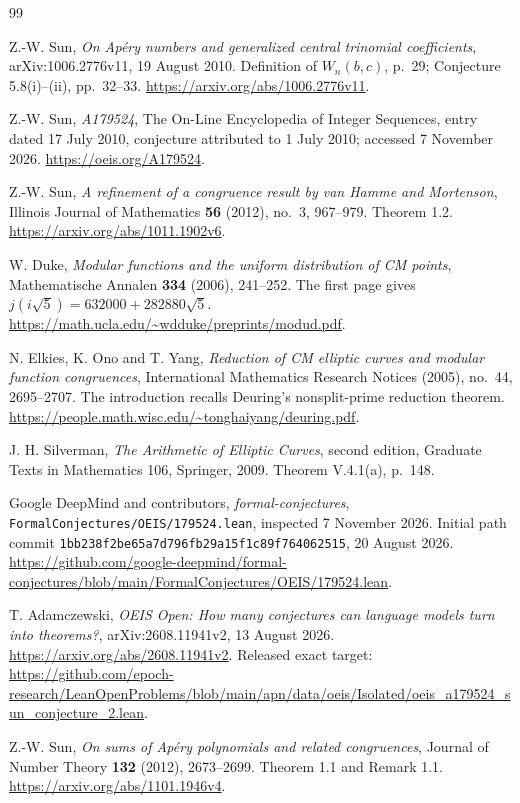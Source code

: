 \documentclass[11pt,a4paper]{article}
\theoremstyle{remark}\newtheorem{remark}[theorem]{Remark}
\begin{document}
\begin{thebibliography}{99}
\raggedright
{}
Z.-W. Sun, \emph{On Ap\'ery numbers and generalized central trinomial
coefficients}, arXiv:1006.2776v11, 19 August 2010.
Definition of \(W_n(b,c)\), p.~29; Conjecture 5.8(i)--(ii), pp.~32--33.
\url{https://arxiv.org/abs/1006.2776v11}.

Z.-W. Sun, \emph{A179524}, The On-Line Encyclopedia of Integer Sequences,
entry dated 17 July 2010, conjecture attributed to 1 July 2010;
accessed 7 November 2026.
\url{https://oeis.org/A179524}.

Z.-W. Sun, \emph{A refinement of a congruence result by van Hamme and
Mortenson}, Illinois Journal of Mathematics \textbf{56} (2012), no.~3,
967--979. Theorem 1.2.
\url{https://arxiv.org/abs/1011.1902v6}.

W. Duke, \emph{Modular functions and the uniform distribution of CM
points}, Mathematische Annalen \textbf{334} (2006), 241--252.
The first page gives \(j(i\sqrt5)=632000+282880\sqrt5\).
\url{https://math.ucla.edu/~wdduke/preprints/modud.pdf}.

N. Elkies, K. Ono and T. Yang, \emph{Reduction of CM elliptic curves and
modular function congruences}, International Mathematics Research
Notices (2005), no.~44, 2695--2707.
The introduction recalls Deuring's nonsplit-prime reduction theorem.
\url{https://people.math.wisc.edu/~tonghaiyang/deuring.pdf}.

J. H. Silverman, \emph{The Arithmetic of Elliptic Curves}, second edition,
Graduate Texts in Mathematics 106, Springer, 2009.
Theorem V.4.1(a), p.~148.

\newpage
{}
Google DeepMind and contributors, \emph{formal-conjectures},
\texttt{FormalConjectures/OEIS/179524.lean}, inspected 7 November 2026.
Initial path commit \texttt{1bb238f2be65a7d796fb29a15f1c89f764062515},
20 August 2026.
\url{https://github.com/google-deepmind/formal-conjectures/blob/main/FormalConjectures/OEIS/179524.lean}.

T. Adamczewski, \emph{OEIS Open: How many conjectures can language
models turn into theorems?}, arXiv:2608.11941v2, 13 August 2026.
\url{https://arxiv.org/abs/2608.11941v2}.
Released exact target:
\url{https://github.com/epoch-research/LeanOpenProblems/blob/main/apn/data/oeis/Isolated/oeis_a179524_sun_conjecture_2.lean}.

Z.-W. Sun, \emph{On sums of Ap\'ery polynomials and related congruences},
Journal of Number Theory \textbf{132} (2012), 2673--2699.
Theorem 1.1 and Remark 1.1.
\url{https://arxiv.org/abs/1101.1946v4}.


\end{thebibliography}
\end{document}
